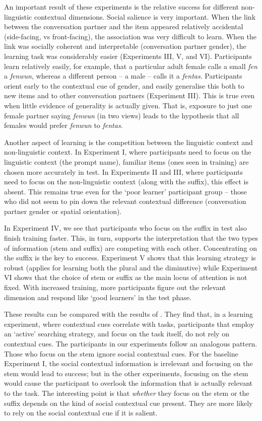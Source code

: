 \documentclass{frontiersSCNS} %
\begin{document}
An important result of these experiments is the relative success for different non-linguistic contextual dimensions.   Social salience is  very important.  When the link between the conversation partner and the item appeared relatively accidental (side-facing, vs front-facing), the association was very difficult to learn.   When the link was socially coherent and interpretable (conversation partner gender), the learning task was considerably easier (Experiments III, V, and VI).   Participants  learn relatively easily, for example, that a particular adult female calls a small {\em fen} a {\em fenwun}, whereas a different person -- a male -- calls it a {\em fentas}.   Participants orient early to the contextual cue of gender, and easily generalise this both to new items and to other conversation partners (Experiment III).   This is true even when little evidence of generality is actually given. That is, exposure to just one female partner saying {\em fenwun} (in two views) leads to the hypothesis that all females would prefer {\em fenwun} to {\em  fentas}.

Another aspect of learning is the competition between the linguistic context and non-linguistic context.  In Experiment I, where participants need to focus on the linguistic context (the prompt name), familiar items (ones seen in training) are chosen more accurately in test.  In Experiments II and III, where participants need to focus on the non-linguistic context (along with the suffix), this effect is absent. This remains true even for the `poor learner' participant group -- those who did not seem to pin down the relevant contextual difference (conversation partner gender or spatial orientation).

In Experiment IV, we see that participants who focus on the suffix in test also finish training faster. This, in turn, supports the interpretation that the two types of information (stem and suffix) are competing with each other. Concentrating on the suffix is the key to success.  Experiment V shows that this learning strategy is robust (applies for learning both the plural and the diminutive) while Experiment VI shows that the choice of stem or suffix as the main locus of attention is not fixed. With increased training, more participants figure out the relevant dimension and respond like `good learners'  in the test phase. 

These results can be compared with the results of \cite{lleras2004spatial}. They find that, in a learning experiment, where contextual cues correlate with tasks, participants that employ an `active' searching strategy, and focus on the task itself, do not rely on contextual cues. The participants in our experiments follow an analogous pattern. Those who focus on the stem ignore social contextual cues. For the baseline Experiment I, the social contextual information is irrelevant and  focusing on the stem would lead to success; but in the other experiments, focusing on the stem would cause the participant to overlook the information that is actually relevant to the task. The interesting point is that \emph{whether} they focus on the stem or the suffix depends on the kind of social contextual cue present. They are more likely to rely on the social contextual cue if it is salient.
\end{document}
